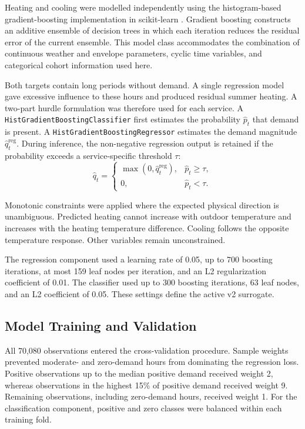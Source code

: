 \documentclass[10pt,twocolumn]{article}
\begin{document}
Heating and cooling were modelled independently using the histogram-based
gradient-boosting implementation in scikit-learn
\cite{friedman2001,pedregosa2011,ke2017}. Gradient boosting constructs an
additive ensemble of decision trees in which each iteration reduces the
residual error of the current ensemble. This model class accommodates the
combination of continuous weather and envelope parameters, cyclic time
variables, and categorical cohort information used here.

Both targets contain long periods without demand. A single regression model
gave excessive influence to these hours and produced residual summer heating.
A two-part hurdle formulation was therefore used for each service. A
\texttt{HistGradientBoostingClassifier} first estimates the probability
$\widehat p_t$ that demand is present. A
\texttt{HistGradientBoostingRegressor} estimates the demand magnitude
$\widehat q_t^{\mathrm{reg}}$. During inference, the non-negative regression
output is retained if the probability exceeds a service-specific threshold
$\tau$:
\begin{equation}
\widehat q_t =
\begin{cases}
\max(0,\widehat q_t^{\mathrm{reg}}), & \widehat p_t \geq \tau,\\
0, & \widehat p_t < \tau.
\end{cases}
\label{eq:hurdle}
\end{equation}

Monotonic constraints were applied where the expected physical direction is
unambiguous. Predicted heating cannot increase with outdoor temperature and
increases with the heating temperature difference. Cooling follows the
opposite temperature response. Other variables remain unconstrained.

The regression component used a learning rate of 0.05, up to 700 boosting
iterations, at most 159 leaf nodes per iteration, and an L2 regularization
coefficient of 0.01. The classifier used up to 300 boosting iterations, 63 leaf
nodes, and an L2 coefficient of 0.05. These settings define the active v2
surrogate.

\subsection{Model Training and Validation}

All 70,080 observations entered the cross-validation procedure. Sample weights
prevented moderate- and zero-demand hours from dominating the regression loss.
Positive observations up to the median positive demand received weight 2,
whereas observations in the highest 15\% of positive demand received weight 9.
Remaining observations, including zero-demand hours, received weight 1. For
the classification component, positive and zero classes were balanced within
each training fold.
\end{document}
